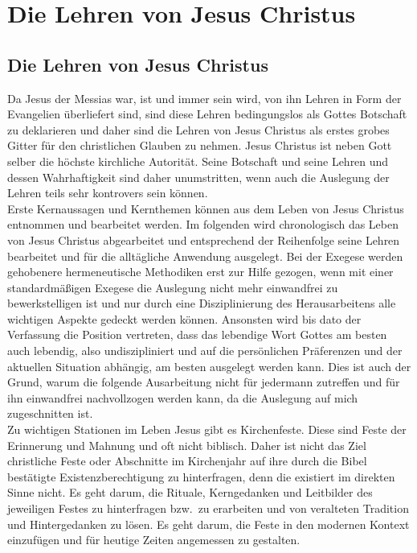 \part{Die Lehren von Jesus Christus}
\chapter*{Die Lehren von Jesus Christus}
Da Jesus der Messias war, ist und immer sein wird, von ihn Lehren in Form der Evangelien überliefert sind, sind diese
Lehren bedingungslos als Gottes Botschaft zu deklarieren und daher sind die Lehren von Jesus Christus als erstes grobes
Gitter für den christlichen Glauben zu nehmen. Jesus Christus ist neben Gott selber die höchste kirchliche Autorität.
Seine Botschaft und seine Lehren und dessen Wahrhaftigkeit sind daher unumstritten, wenn auch die Auslegung der Lehren
teils sehr kontrovers sein können.\\

Erste Kernaussagen und Kernthemen können aus dem Leben von Jesus Christus entnommen und bearbeitet werden. Im folgenden
wird chronologisch das Leben von Jesus Christus abgearbeitet und entsprechend der Reihenfolge seine Lehren bearbeitet
und für die alltägliche Anwendung ausgelegt. Bei der Exegese werden gehobenere hermeneutische Methodiken erst zur Hilfe
gezogen, wenn mit einer standardmäßigen Exegese die Auslegung nicht mehr einwandfrei zu bewerkstelligen ist und nur
durch eine Disziplinierung des Herausarbeitens alle wichtigen Aspekte gedeckt werden können. Ansonsten wird bis dato
der Verfassung die Position vertreten, dass das lebendige Wort Gottes am besten auch lebendig, also undiszipliniert und
auf die persönlichen Präferenzen und der aktuellen Situation abhängig, am besten ausgelegt werden kann. Dies ist auch
der Grund, warum die folgende Ausarbeitung nicht für jedermann zutreffen und für ihn einwandfrei nachvollzogen werden
kann, da die Auslegung auf mich zugeschnitten ist. \\

Zu wichtigen Stationen im Leben Jesus gibt es Kirchenfeste. Diese sind Feste der Erinnerung und Mahnung und oft nicht
biblisch. Daher ist nicht das Ziel christliche Feste oder Abschnitte im Kirchenjahr auf ihre durch die Bibel bestätigte
Existenzberechtigung zu hinterfragen, denn die existiert im direkten Sinne nicht. Es geht darum, die Rituale,
Kerngedanken und Leitbilder des jeweiligen Festes zu hinterfragen bzw.\ zu erarbeiten und von veralteten Tradition und
Hintergedanken zu lösen. Es geht darum, die Feste in den modernen Kontext einzufügen und für heutige Zeiten angemessen
zu gestalten.





